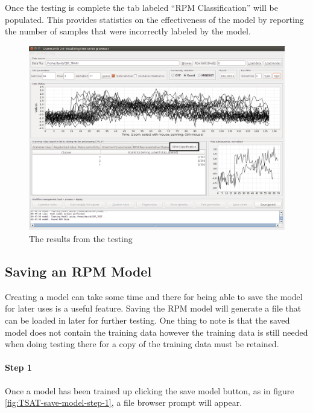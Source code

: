 \documentclass[letterpaper, 12pt]{article}
\begin{document}
\newpage
Once the testing is complete the tab labeled ``RPM Classification'' will be populated. This provides statistics on the effectiveness of the model by reporting the number of samples that were incorrectly labeled by the model.

\begin{figure}[H]
  \includegraphics[width=\textwidth]{TSAT-testing-step-2}
  \caption{The results from the testing}
  \label{fig:TSAT-testing-step-2}
\end{figure}

\newpage
\subsection{Saving an RPM Model}
Creating a model can take some time and there for being able to save the model for later uses is a useful feature. Saving the RPM model will generate a file that can be loaded in later for further testing. One thing to note is that the saved model does not contain the training data however the training data is still needed when doing testing there for a copy of the training data must be retained.

\paragraph{Step 1}
Once a model has been trained up clicking the save model button, as in figure \ref{fig:TSAT-save-model-step-1}, a file browser prompt will appear.
\end{document}
